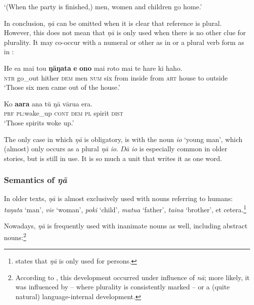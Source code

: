 \glt
‘(When the party is finished,) men, women and children go home.’ \textstyleExampleref{[Mtx-7-30.037]}
\z

In conclusion, \textit{ŋā} can be omitted when it is clear that reference is plural. However, this does not mean that \textit{ŋā} is only used when there is no other clue for plurality. It may co-occur with a numeral or other  as in  or a plural verb form as in :

\ea\label{ex:5.80}
\gll He e{\ꞌ}a mai tou \textbf{ŋāŋata} \textbf{e} \textbf{ono} mai roto mai te hare ki haho. \\
\textsc{ntr} go\_out hither \textsc{dem} men \textsc{num} six from inside from \textsc{art} house to outside \\

\glt 
‘Those six men came out of the house.’ \textstyleExampleref{[Ley-4-01.023]}
\z

\ea\label{ex:5.81}
\gll Ko \textbf{{\ꞌ}a{\ꞌ}ara} {\ꞌ}ana tū ŋā vārua era. \\
\textsc{prf} \textsc{pl}:wake\_up \textsc{cont} \textsc{dem} \textsc{pl} spirit \textsc{dist} \\

\glt
‘Those spirits woke up.’ \textstyleExampleref{[R233.026]} 
\z

The only case in which \textit{ŋā} is obligatory, is with the noun \textit{io} ‘young man’, which (almost) only occurs as a plural \textit{ŋā io}. \textit{Ŋā io} is especially common in older stories, but is still in use. It is so much a unit that \citet{Englert1978,Englert1980} writes it as one word. 

\subsubsection[Semantics of ŋā]{Semantics of \textit{ŋā}}\label{sec:5.5.1.3}

In older texts, \textit{ŋā} is almost exclusively used with nouns referring to humans: \textit{taŋata} ‘man’, \textit{vi{\ꞌ}e} ‘woman’, \textit{poki} ‘child’, \textit{matu{\ꞌ}a} ‘father’, \textit{taina} ‘brother’, et cetera.\footnote{\label{fn:262}\citet[26]{Englert1978} states that \textit{ŋā} is only used for persons.} 

Nowadays, \textit{ŋā} is frequently used with inanimate nouns as well, including abstract nouns:\footnote{\label{fn:263}According to \citet[170]{Schuhmacher1993}, this development occurred under influence of  \textit{nā}; more likely, it was influenced by  – where plurality is consistently marked – or a (quite natural) language-internal development.}

